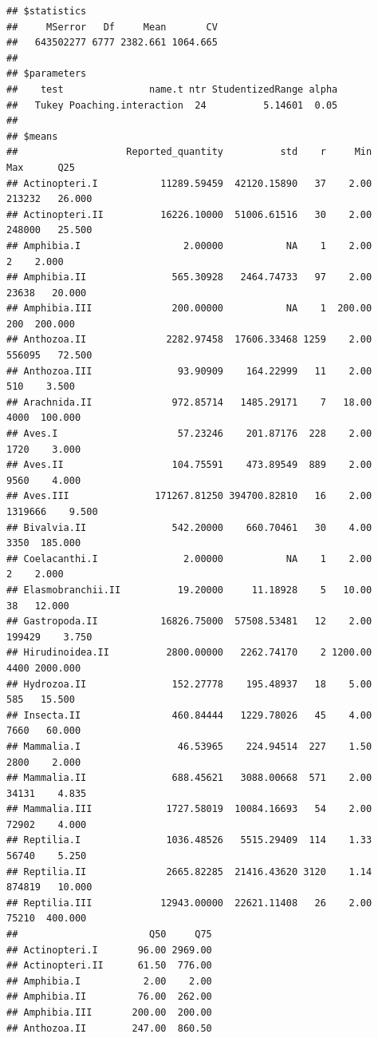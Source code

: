 \documentclass[
  12pt,
]{article}
\begin{document}
\begin{verbatim}
## $statistics
##     MSerror   Df     Mean       CV
##   643502277 6777 2382.661 1064.665
## 
## $parameters
##    test               name.t ntr StudentizedRange alpha
##   Tukey Poaching.interaction  24          5.14601  0.05
## 
## $means
##                   Reported_quantity          std    r     Min     Max      Q25
## Actinopteri.I           11289.59459  42120.15890   37    2.00  213232   26.000
## Actinopteri.II          16226.10000  51006.61516   30    2.00  248000   25.500
## Amphibia.I                  2.00000           NA    1    2.00       2    2.000
## Amphibia.II               565.30928   2464.74733   97    2.00   23638   20.000
## Amphibia.III              200.00000           NA    1  200.00     200  200.000
## Anthozoa.II              2282.97458  17606.33468 1259    2.00  556095   72.500
## Anthozoa.III               93.90909    164.22999   11    2.00     510    3.500
## Arachnida.II              972.85714   1485.29171    7   18.00    4000  100.000
## Aves.I                     57.23246    201.87176  228    2.00    1720    3.000
## Aves.II                   104.75591    473.89549  889    2.00    9560    4.000
## Aves.III               171267.81250 394700.82810   16    2.00 1319666    9.500
## Bivalvia.II               542.20000    660.70461   30    4.00    3350  185.000
## Coelacanthi.I               2.00000           NA    1    2.00       2    2.000
## Elasmobranchii.II          19.20000     11.18928    5   10.00      38   12.000
## Gastropoda.II           16826.75000  57508.53481   12    2.00  199429    3.750
## Hirudinoidea.II          2800.00000   2262.74170    2 1200.00    4400 2000.000
## Hydrozoa.II               152.27778    195.48937   18    5.00     585   15.500
## Insecta.II                460.84444   1229.78026   45    4.00    7660   60.000
## Mammalia.I                 46.53965    224.94514  227    1.50    2800    2.000
## Mammalia.II               688.45621   3088.00668  571    2.00   34131    4.835
## Mammalia.III             1727.58019  10084.16693   54    2.00   72902    4.000
## Reptilia.I               1036.48526   5515.29409  114    1.33   56740    5.250
## Reptilia.II              2665.82285  21416.43620 3120    1.14  874819   10.000
## Reptilia.III            12943.00000  22621.11408   26    2.00   75210  400.000
##                       Q50     Q75
## Actinopteri.I       96.00 2969.00
## Actinopteri.II      61.50  776.00
## Amphibia.I           2.00    2.00
## Amphibia.II         76.00  262.00
## Amphibia.III       200.00  200.00
## Anthozoa.II        247.00  860.50

\end{verbatim}
\end{document}
